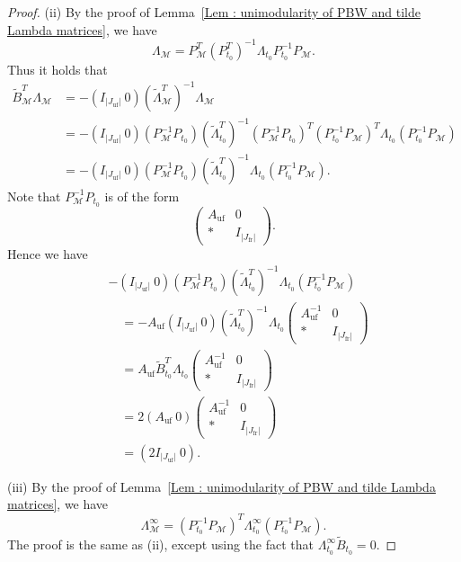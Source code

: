 \begin{proof}
(ii) By the proof of
Lemma~\ref{Lem : unimodularity of PBW and tilde Lambda matrices},
we have
\[
\Lambda_{\mathcal M}
= P_{\mathcal M}^{T}(P_{t_0}^{T})^{-1}
\Lambda_{t_0}P_{t_0}^{-1}P_{\mathcal M}.
\]
Thus it holds that
\[
\begin{aligned}
\widetilde B_{\mathcal M}^{T}\Lambda_{\mathcal M}
&= -(I_{|J_{\mathrm{uf}}|}\ 0)
(\widetilde\Lambda_{\mathcal M}^{T})^{-1}\Lambda_{\mathcal M}
\\
&= -(I_{|J_{\mathrm{uf}}|}\ 0)(P_{\mathcal M}^{-1}P_{t_0})
(\widetilde\Lambda_{t_0}^{T})^{-1}
(P_{\mathcal M}^{-1}P_{t_0})^{T} 
 (P_{t_0}^{-1}P_{\mathcal M})^{T}
\Lambda_{t_0}(P_{t_0}^{-1}P_{\mathcal M}) \\
&= -(I_{|J_{\mathrm{uf}}|}\ 0)(P_{\mathcal M}^{-1}P_{t_0})
(\widetilde\Lambda_{t_0}^{T})^{-1}
\Lambda_{t_0}(P_{t_0}^{-1}P_{\mathcal M}).
\end{aligned}
\]
Note that $P_{\mathcal M}^{-1}P_{t_0}$ is of the form
\[
\begin{pmatrix} A_{\mathrm{uf}} & 0 \\ * & I_{|J_{\mathrm{fr}}|} \end{pmatrix}.
\]
Hence we have
\[
\begin{aligned}
&-(I_{|J_{\mathrm{uf}}|}\ 0)(P_{\mathcal M}^{-1}P_{t_0})
(\widetilde\Lambda_{t_0}^{T})^{-1}
\Lambda_{t_0}(P_{t_0}^{-1}P_{\mathcal M}) \\
&\quad= -A_{\mathrm{uf}}(I_{|J_{\mathrm{uf}}|}\ 0)
(\widetilde\Lambda_{t_0}^{T})^{-1}\Lambda_{t_0}
\begin{pmatrix}
A_{\mathrm{uf}}^{-1} & 0 \\ * & I_{|J_{\mathrm{fr}}|}
\end{pmatrix} \\
&\quad= A_{\mathrm{uf}}\widetilde B_{t_0}^{T}\Lambda_{t_0}
\begin{pmatrix}
A_{\mathrm{uf}}^{-1} & 0 \\ * & I_{|J_{\mathrm{fr}}|}
\end{pmatrix} \\
&\quad= 2(A_{\mathrm{uf}}\ 0)
\begin{pmatrix}
A_{\mathrm{uf}}^{-1} & 0 \\ * & I_{|J_{\mathrm{fr}}|}
\end{pmatrix} \\
&\quad= (2I_{|J_{\mathrm{uf}}|}\ 0).
\end{aligned}
\]

(iii) By the proof of
Lemma~\ref{Lem : unimodularity of PBW and tilde Lambda matrices},
we have
\[
\Lambda^{\infty}_{\mathcal M}
= (P_{t_0}^{-1}P_{\mathcal M})^{T}\Lambda^{\infty}_{t_0}
(P_{t_0}^{-1}P_{\mathcal M}).
\]
The proof is the same as (ii), except using the fact that
$\Lambda^{\infty}_{t_0}\widetilde B_{t_0} = 0$.
\end{proof}

